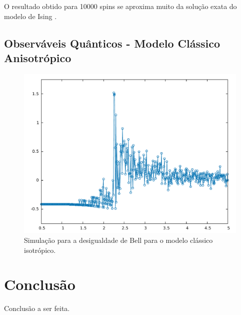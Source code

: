 O resultado obtido para 10000 spins se aproxima muito da solução exata do modelo de Ising \cite{Baxter, Huang}. 



































\subsection{Observáveis Quânticos - Modelo Clássico Anisotrópico}
\label{subsec:ObservaveisQuanticosModeloAnisotropico}

\begin{figure}[h]
	\center
	\includegraphics[scale=.35]{IsotropicMBell.pdf}
	\caption{Simulação para a desigualdade de Bell para o modelo clássico isotrópico.}
\end{figure}



























\section{Conclusão}
\label{sec:Conclusao}

Conclusão a ser feita.






\clearpage






\label{Referencias}


